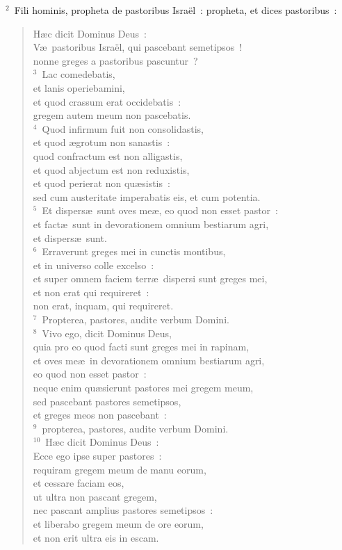 ${}^{2}$~Fili hominis, propheta de pastoribus Isra\"el~: propheta, et dices pastoribus~: \begin{flushleft}\begin{verse}H\ae c dicit Dominus Deus~:\\ V\ae\ pastoribus Isra\"el, qui pascebant semetipsos~!\\ nonne greges a pastoribus pascuntur~?\\
${}^{3}$~Lac comedebatis,\\ et lanis operiebamini,\\ et quod crassum erat occidebatis~:\\ gregem autem meum non pascebatis.\\
${}^{4}$~Quod infirmum fuit non consolidastis,\\ et quod \ae grotum non sanastis~:\\ quod confractum est non alligastis,\\ et quod abjectum est non reduxistis,\\ et quod perierat non qu\ae sistis~:\\ sed cum austeritate imperabatis eis, et cum potentia.\\
${}^{5}$~Et dispers\ae\ sunt oves me\ae , eo quod non esset pastor~:\\ et fact\ae\ sunt in devorationem omnium bestiarum agri,\\ et dispers\ae\ sunt.\\
${}^{6}$~Erraverunt greges mei in cunctis montibus,\\ et in universo colle excelso~:\\ et super omnem faciem terr\ae\ dispersi sunt greges mei,\\ et non erat qui requireret~:\\ non erat, inquam, qui requireret.\\
${}^{7}$~Propterea, pastores, audite verbum Domini.\\
${}^{8}$~Vivo ego, dicit Dominus Deus,\\ quia pro eo quod facti sunt greges mei in rapinam,\\ et oves me\ae\ in devorationem omnium bestiarum agri,\\ eo quod non esset pastor~:\\ neque enim qu\ae sierunt pastores mei gregem meum,\\ sed pascebant pastores semetipsos,\\ et greges meos non pascebant~:\\
${}^{9}$~propterea, pastores, audite verbum Domini.\\
${}^{10}$~H\ae c dicit Dominus Deus~:\\ Ecce ego ipse super pastores~:\\ requiram gregem meum de manu eorum,\\ et cessare faciam eos,\\ ut ultra non pascant gregem,\\ nec pascant amplius pastores semetipsos~:\\ et liberabo gregem meum de ore eorum,\\ et non erit ultra eis in escam.\end{verse}\end{flushleft}


